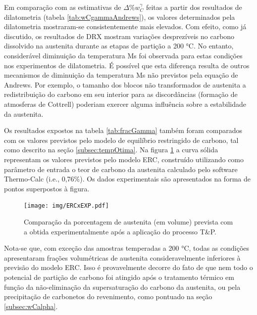 Em comparação com as estimativas de $\Delta \%w_C^\gamma$ feitas a partir dos resultados de dilatometria (tabela \ref{tab:wCgammaAndrews}), os valores determinados pela dilatometria mostraram-se consistentemente mais elevados. Com efeito, como já discutido, os resultados de DRX mostram variações desprezíveis no carbono dissolvido na austenita durante as etapas de partição a 200 °C. No entanto, considerável diminuição da temperatura Ms foi observada para estas condições nos experimentos de dilatometria. É possível que esta diferença resulta de outros mecanismos de diminuição da temperatura Ms não previstos pela equação de Andrews. Por exemplo, o tamanho dos blocos não transformados de austenita a redistribuição do carbono em seu interior para as discordâncias (formação de atmosferas de Cottrell) poderiam exercer alguma influência sobre a estabilidade da austenita.

Os resultados expostos na tabela \ref{tab:fracGamma} também foram comparados com os valores previstos pelo modelo de equilíbrio restringido de carbono, tal como descrito na seção \ref{subsec:tempOtima}. Na figura \ref{fig:ERCxEXP} a curva sólida representam os valores previstos pelo modelo ERC, construído utilizando como parâmetro de entrada o teor de carbono da austenita calculado pelo software Thermo-Calc\textregistered{} (i.e., 0,76\%). Os dados experimentais são apresentados na forma de pontos superpostos à figura.

\begin{figure}
	\texttt{[image: img/ERCxEXP.pdf]}
	\caption{Comparação da porcentagem de austenita (em volume) prevista com a obtida experimentalmente após a aplicação do processo T\&P.}
	\label{fig:ERCxEXP}
\end{figure}

Nota-se que, com exceção das amostras temperadas a 200 °C, todas as condições apresentaram frações volumétricas de austenita consideravelmente inferiores à previsão do modelo ERC. Isso é provavelmente decorre do fato de que nem todo o potencial de partição de carbono foi atingido após o tratamento térmico em função da não-eliminação da supersaturação do carbono da austenita, ou pela precipitação de carbonetos do revenimento, como pontuado na seção \ref{subsec:wCalpha}.